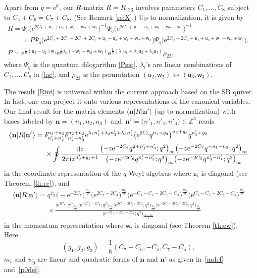 \documentclass[pdftex]{sigma}
\newcommand{\Z}{{\mathbb Z}}
\newcommand{\e}{{\mathrm e}}
\newcommand{\uu}{{\mathsf u}}
\newcommand{\ww}{{\mathsf w}}
\numberwithin{equation}{section}
\begin{document}
Apart from $q=\e^\hbar$, our $R$-matrix $R=R_{123}$ involves
parameters $C_1, \dots, C_8$ subject to $C_5+C_6=C_7+C_8$.
(See Remark \ref{re:X}.)
Up to normalization, it is given by
\begin{gather}
R =
\Psi_q\bigl(\e^{2C_7+\uu_1+\uu_3+\ww_1-\ww_2+\ww_3}\bigr)^{-1}
\Psi_q\bigl(\e^{2C_5+\uu_1-\uu_3+\ww_1-\ww_2+\ww_3}\bigr)^{-1}\nonumber
\\
\phantom{R =}{} \times P
\Psi_q\bigl(\e^{2C_2+2C_3-2C_6+2C_8+\uu_1-\uu_3+\ww_1-\ww_2+\ww_3}\bigr)
\Psi_q\bigl(\e^{2C_2+2C_3+\uu_1+\uu_3+\ww_1-\ww_2+\ww_3}\bigr),\nonumber
\\
P= \e^{\tfrac{1}{\hbar}(\uu_3-\uu_2)\ww_1}
\e^{\tfrac{1}{\hbar}\lambda_0(-\ww_1-\ww_2+\ww_3)}
\e^{\tfrac{1}{\hbar}(\lambda_1\uu_1+\lambda_2\uu_2+\lambda_3\uu_3)}\rho_{23},\label{Rint}
\end{gather}
where $\Psi_q$ is the quantum dilogarithm \eqref{Psiq}, $\lambda_i$'s
are linear combinations of $C_1, \dots, C_8$ in \eqref{lac}, and
$\rho_{23}$ is the permutation $(\uu_2,\ww_2) \leftrightarrow (\uu_3,\ww_3)$.

The result \eqref{Rint} is universal within the current approach based on the SB quiver.
In fact, one can project it onto various representations of the canonical variables.
Our final result for the matrix elements $\langle \mathbf{n}| R\bigl| \mathbf{n}'\bigr\rangle$
(up to normalization) with bases labeled by
$\mathbf{n} = (n_1, n_2, n_3)$ and~${\mathbf{n}' = \bigl(n'_1, n'_2, n'_3\bigr) \in \Z^3}$ reads
\begin{align}
\bigl\langle \mathbf{n}| R| \mathbf{n}'\bigr\rangle
={}& \delta^{n_1+n_2}_{n'_1+n'_2} \delta^{n_2+n_3}_{n'_2+n'_3}
\e^{\lambda_1 n'_1+\lambda_2n'_3+\lambda_3 n'_2}
\bigl(\e^{2C_5}q^{n_1+g_3}\bigr)^{n_3+g_3}q^{n'_2+g_2}\nonumber
\\
& \times
\oint\frac{{\rm d}z}{2\pi{\rm i} z^{n'_2+g_2+1}}
\frac{\bigl(-z\e^{-2C_8}q^{2+n'_1+n'_3};q^2\bigr)_\infty\bigl(-z\e^{-2C_7}q^{-n_1-n_3};q^2\bigr)_\infty}
{\bigl(-z\e^{-2C_6}q^{n'_1-n'_3};q^2\bigr)_\infty\bigl(-z\e^{-2C_5}q^{n'_3-n'_1};q^2\bigr)_\infty}\label{co}
\end{align}
in the coordinate representation of the $q$-Weyl algebras where $\uu_i$ is diagonal (see Theorem \ref{th:re}),
and
\begin{gather}
\bigl\langle \mathbf{n}| R| \mathbf{n}'\bigr\rangle
 = q^{\psi_0}
\bigl(-\e^{-2C_7}\bigr)^{\frac{m_1}{2}}
\bigl(\e^{2C_8-2C_3}\bigr)^{\frac{m_2}{2}}
\bigl(\e^{-C_1-C_2-2C_3-C_4}\bigr)^{\frac{m_3}{2}}
\bigl(\e^{C_1-C_2-2C_3-C_4}\bigr)^{\frac{m_4}{2}}\label{mo}
\\
\phantom{\bigl\langle \mathbf{n}| R| \mathbf{n}'\bigr\rangle =}{} \times
\frac{\bigl(\e^{2C_3};q^2\bigr)_{\frac{m_1}{2}}
\bigl(\e^{-2C_2-2C_8};q^2\bigr)_{\frac{m_2}{2}}
\bigl(\e^{2C_1-2C_3+2C_5};q^2\bigr)_{\frac{m_3}{2}}
\bigl(\e^{-2C_1-2C_3+2C_6};q^2\bigr)_{\frac{m_4}{2}}}
{\bigl(\e^{-4C_3+2C_5+2C_6};q^2\bigr)_{\frac{m_3+m_4}{2}}}\nonumber
\end{gather}
in the momentum representation where $\ww_i$ is diagonal (see Theorem \ref{th:ew}).
Here {\samepage \[(g_1,g_2,g_3)=\frac{1}{\hbar}(C_7-C_6,-C_4,C_7-C_5),\]
$m_i$ and $\psi_0$ are linear and quadratic forms of
$\mathbf{n}$ and $\mathbf{n}'$ as given in~\eqref{mdef} and~\eqref{p0def}.}
\end{document}

